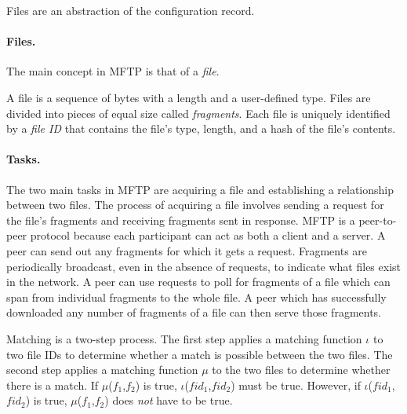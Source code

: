 \documentclass[letterpaper]{article}
\begin{document}



Files are an abstraction of the configuration record.

\paragraph {Files.}
The main concept in MFTP is that of a \emph{file}.

A file is a sequence of bytes with a length and a user-defined type.
Files are divided into pieces of equal size called \emph{fragments}.
Each file is uniquely identified by a \emph{file ID} that contains the file's type, length, and a hash of the file's contents.


\paragraph {Tasks.}
The two main tasks in MFTP are acquiring a file and establishing a relationship between two files.
The process of acquiring a file involves sending a request for the file's fragments and receiving fragments sent in response.
MFTP is a peer-to-peer protocol because each participant can act as both a client and a server.
A peer can send out any fragments for which it gets a request.
Fragments are periodically broadcast, even in the absence of requests, to indicate what files exist in the network.
A peer can use requests to poll for fragments of a file which can span from individual fragments to the whole file.
A peer which has successfully downloaded any number of fragments of a file can then serve those fragments.

Matching is a two-step process.
The first step applies a matching function $\iota$ to two file IDs to determine whether a match is possible between the two files.  
The second step applies a matching function $\mu$ to the two files to determine whether there is a match.
If $\mu$($f_1$,$f_2$) is true, $\iota$($fid_1$,$fid_2$) must be true.
However, if $\iota$($fid_1$,$fid_2$) is true, $\mu$($f_1$,$f_2$) does \emph{not} have to be true. 
\end{document}
